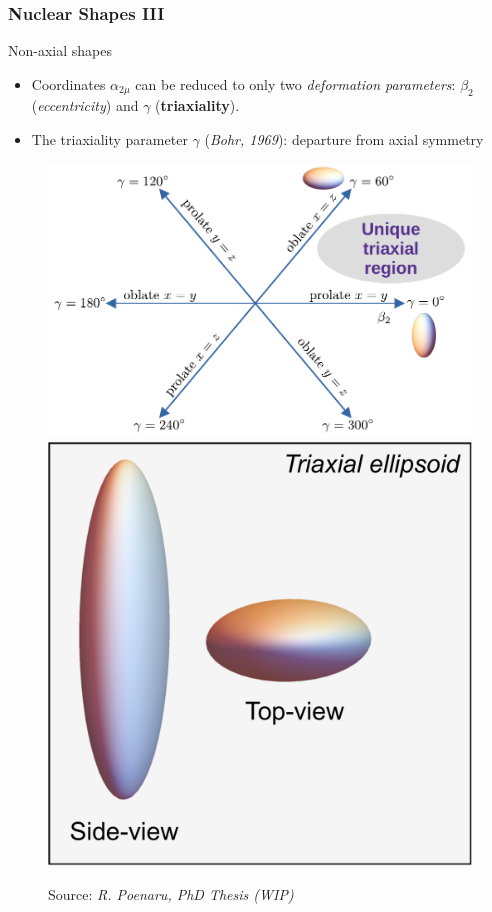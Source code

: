 \documentclass[
	11pt, %
]{beamer}
\begin{document}
\begin{frame}
	\frametitle{Nuclear Shapes III}
	\vspace{-0.2cm}
	\begin{alertblock}{Non-axial shapes}
		\begin{itemize}
			\item Coordinates $\alpha_{2\mu}$ can be reduced to only two \emph{deformation parameters}: $\beta_2$ (\emph{eccentricity}) and $\gamma$ (\textbf{triaxiality}).
			\item The triaxiality parameter $\gamma$ (\textit{Bohr, 1969}): departure from axial symmetry
		\end{itemize}
	\end{alertblock}
	\vspace{-0.2cm}
	\begin{figure}
		\centering
		\includegraphics[scale=0.42]{figures/nice_diagram.pdf}
		\includegraphics[scale=0.19]{figures/triaxial-shape.pdf}
		\vspace{-0.41cm}
		\caption{Source: \emph{R. Poenaru, PhD Thesis (WIP)}}
	\end{figure}
\end{frame}
\end{document}
